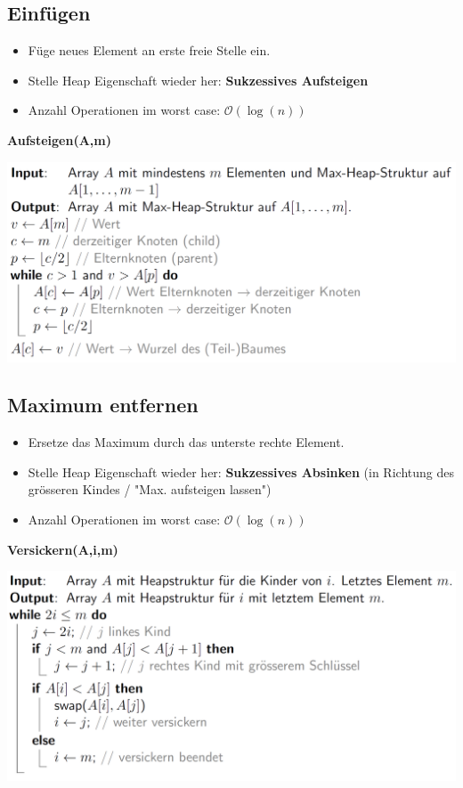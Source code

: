\begin{sectionbox}
\subsection{Einfügen}\smallskip
\begin{itemize}
    \item Füge neues Element an erste freie Stelle ein.
    \item Stelle Heap Eigenschaft wieder her: \textbf{Sukzessives Aufsteigen}
    \item Anzahl Operationen im worst case: $\mathcal{O}(\operatorname{log}(n))$
\end{itemize}\smallskip
\textbf{Aufsteigen(A,m)}\par
\includegraphics[width = \columnwidth]{../img/Aufsteigen.png}
\end{sectionbox}

\begin{sectionbox}
\subsection{Maximum entfernen}\smallskip
\begin{itemize}
    \item Ersetze das Maximum durch das unterste rechte Element.
    \item Stelle Heap Eigenschaft wieder her: \textbf{Sukzessives Absinken} (in Richtung des grösseren Kindes / "Max. aufsteigen lassen")
    \item Anzahl Operationen im worst case: $\mathcal{O}(\operatorname{log}(n))$
\end{itemize}\smallskip
\textbf{Versickern(A,i,m)}\par
\includegraphics[width = \columnwidth]{../img/Versickern.png}
\end{sectionbox}


